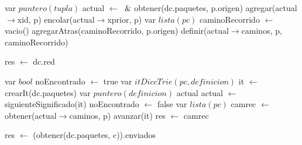 \begin{algorithm}\phantom{[H]}
\begin{algorithmic}[1]
  \State var $puntero(tupla)$ actual $\gets$ $\And$obtener(dc.paquetes, p.origen) 
  \State agregar(actual$\rightarrow$xid, p) 
  \State encolar(actual$\rightarrow$xprior, p) 
  \State var $lista(pc)$ caminoRecorrido $\gets$ vacio() 
  \State agregarAtras(caminoRecorrido, p.origen) 
  \State definir(actual$\rightarrow$caminos, p, caminoRecorrido) 
\EndFunction
\end{algorithmic}
\end{algorithm}

\begin{algorithm}\phantom{[H]}
\begin{algorithmic}[1]
  \State res $\gets$ dc.red 
\EndFunction
\end{algorithmic}
\end{algorithm}

\begin{algorithm}\phantom{[H]}
\begin{algorithmic}[1]
 
  \State var $bool$ noEncontrado $\gets$ true 
  \State var $itDiccTrie(pc, definicion)$ it $\gets$ crearIt(dc.paquetes) 
  \State var $puntero(definicion)$ actual  
    
    \State actual $\gets$ siguienteSignificado(it) 
     
      \State noEncontrado $\gets$ false
      \State var $lista(pc)$ camrec $\gets$ obtener(actual$\rightarrow$caminos, p) 
    \Else
      \State avanzar(it) 
    \EndIf
  \EndWhile
  \State res $\gets$ camrec 
\EndFunction
\end{algorithmic}
\end{algorithm}

\begin{algorithm}\phantom{[H]}
\begin{algorithmic}[1]
 
  \State res $\gets$ (obtener(dc.paquetes, c)).enviados 
\EndFunction
\end{algorithmic}
\end{algorithm}

